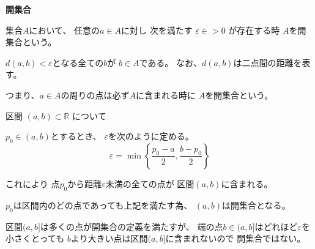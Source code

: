 \documentclass[12pt,b5paper]{ltjsarticle}
\begin{document}
\textbf{開集合}

集合$A$において、
任意の$a\in A$に対し
次を満たす $\varepsilon\in >0$ が存在する時
$A$を開集合という。

$d(a,b)<\varepsilon$となる全ての$b$が
$b\in A$である。
なお、$d(a,b)$は二点間の距離を表す。


つまり、$a\in A$の周りの点は必ず$A$に含まれる時に
$A$を開集合という。


\dotfill

区間
$(a,b) \subset \mathbb{R}$
について

$p_0 \in (a,b)$とするとき、
$\varepsilon$を次のように定める。
\begin{equation}
 \varepsilon = \min \left\{ \frac{p_0-a}{2}, \frac{b-p_0}{2} \right\}
\end{equation}

これにより 点$p_0$から距離$\varepsilon$未満の全ての点が
区間$(a,b)$に含まれる。

$p_0$は区間内のどの点であっても上記を満たす為、
$(a,b)$は開集合となる。


区間$(a,b]$は多くの点が開集合の定義を満たすが、
端の点$b\in (a,b]$はどれほど$\varepsilon$を小さくとっても
$b$より大きい点は区間$(a,b]$に含まれないので
開集合ではない。
\end{document}
